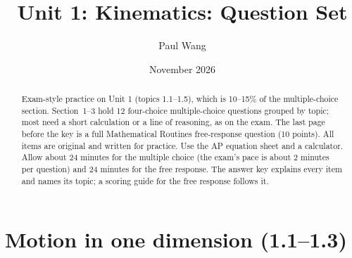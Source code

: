 \documentclass[11pt]{article}
\title{Unit 1: Kinematics: Question Set}
\author{Paul Wang}
\date{November 2026}
\begin{document}
\maketitle

\begin{abstract}
Exam-style practice on Unit 1 (topics 1.1--1.5), which is 10--15\% of the multiple-choice section. Section~1--3 hold 12 four-choice multiple-choice questions grouped by topic; most need a short calculation or a line of reasoning, as on the exam. The last page before the key is a full Mathematical Routines free-response question (10 points). All items are original and written for practice. Use the AP equation sheet and a calculator. Allow about 24 minutes for the multiple choice (the exam's pace is about 2 minutes per question) and 24 minutes for the free response. The answer key explains every item and names its topic; a scoring guide for the free response follows it.
\end{abstract}


\section{Motion in one dimension (1.1--1.3)}
\end{document}

